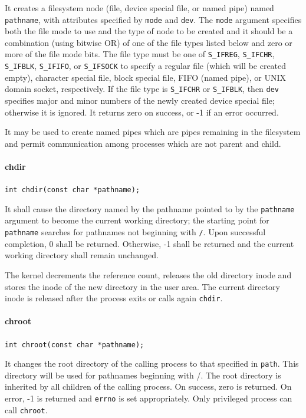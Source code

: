 It creates a filesystem node (file, device special file, or named pipe) named \texttt{pathname}, with attributes specified by \texttt{mode} and \texttt{dev}. The \texttt{mode} argument specifies both the file mode to use and the type of node to be created and it should be a combination (using bitwise OR) of one of the file types listed below and zero or more of the file mode bits. The file type must be one of \texttt{S\_IFREG}, \texttt{S\_IFCHR}, \texttt{S\_IFBLK}, \texttt{S\_IFIFO}, or \texttt{S\_IFSOCK} to specify a regular file (which will be created empty), character special file, block special file, FIFO (named pipe), or UNIX domain socket, respectively. If the file type is \texttt{S\_IFCHR} or \texttt{S\_IFBLK}, then \texttt{dev} specifies major and minor numbers of the newly created device special file; otherwise it is ignored. It returns zero on success, or -1 if an error occurred.

It may be used to create named pipes which are pipes remaining in the filesystem and permit communication among processes which are not parent and child.

\paragraph{chdir}
\texttt{int chdir(const char *pathname);}

It shall cause the directory named by the pathname pointed to by the \texttt{pathname} argument to become the current working directory; the starting point for \texttt{pathname} searches for pathnames not beginning with \texttt{/}. Upon successful completion, 0 shall be returned. Otherwise, -1 shall be returned and the current working directory shall remain unchanged. 

The kernel decrements the reference count, releases the old directory inode and stores the inode of the new directory in the user area. The current directory inode is released after the process exits or calls again \texttt{chdir}.

\paragraph{chroot}
\texttt{int chroot(const char *pathname);}

It changes the root directory of the calling process to that specified in \texttt{path}. This directory will be used for pathnames beginning with /. The root directory is inherited by all children of the calling process. On success, zero is returned. On error, -1 is returned and \texttt{errno} is set appropriately. Only privileged process can call \texttt{chroot}.

